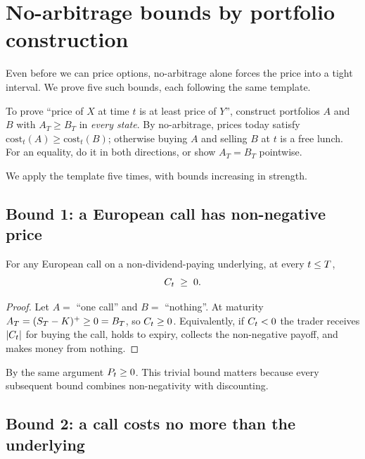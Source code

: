 \section{No-arbitrage bounds by portfolio construction}
\label{sec:ch14_bounds}

Even before we can price options, no-arbitrage alone forces the
price into a tight interval. We prove five such bounds, each
following the same template.

\begin{keyfactbox}
\label{kf:bound_template}
To prove ``price of $X$ at time $t$ is at least price of $Y$'',
construct portfolios $A$ and $B$ with $A_T \geq B_T$ in
\emph{every state}. By no-arbitrage, prices today satisfy
$\text{cost}_t(A) \geq \text{cost}_t(B)$; otherwise buying $A$
and selling $B$ at $t$ is a free lunch. For an equality, do it
in both directions, or show $A_T = B_T$ pointwise.
\end{keyfactbox}

We apply the template five times, with bounds increasing in
strength.

\subsection{Bound 1: a European call has non-negative price}
\label{sec:ch14_bound1}

\begin{proposition}
\label{prop:call_nonneg}
For any European call on a non-dividend-paying underlying, at
every $t \leq T$,
\begin{equation*}
  C_t \;\geq\; 0.
\end{equation*}
\end{proposition}

\begin{proof}
Let $A =$ ``one call'' and $B =$ ``nothing''. At maturity
$A_T = (S_T - K)^+ \geq 0 = B_T$, so
$C_t \geq 0$. Equivalently, if $C_t < 0$ the trader
receives $|C_t|$ for buying the call, holds to expiry,
collects the non-negative payoff, and makes money from nothing.
\end{proof}

By the same argument $P_t \geq 0$. This trivial bound matters
because every subsequent bound combines non-negativity with
discounting.

\subsection{Bound 2: a call costs no more than the underlying}
\label{sec:ch14_bound2}

